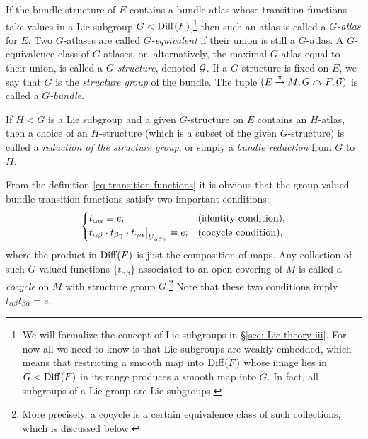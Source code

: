 \begin{defn}[$G$-structure]
    If the bundle structure of $E$ contains a bundle atlas whose transition functions take values in a Lie subgroup $G<\operatorname{Diff}(F)$,\footnote{We will formalize the concept of Lie subgroups in \S\ref{sec: Lie theory iii}. For now all we need to know is that Lie subgroups are weakly embedded, which means that restricting a smooth map into $\operatorname{Diff}(F)$ whose image lies in $G<\operatorname{Diff}(F)$ in its range produces a smooth map into $G$. In fact, all subgroups of a Lie group are Lie subgroups.} then such an atlas is called a \emph{$G$-atlas} for $E$. Two $G$-atlases are called \emph{$G$-equivalent} if their union is still a $G$-atlas. A $G$-equivalence class of $G$-atlases, or, alternatively, the maximal $G$-atlas equal to their union, is called a \emph{$G$-structure}, denoted $\mathcal{G}$. If a $G$-structure is fixed on $E$, we say that $G$ is the \emph{structure group} of the bundle.  The tuple $(E\overset{\pi}{\to}M,G\curvearrowright F,\mathcal{G})$ is called a \emph{$G$-bundle}.
    
    If $H<G$ is a Lie subgroup and a given $G$-structure on $E$ contains an $H$-atlas, then a choice of an $H$-structure (which is a subset of the given $G$-structure) is called a \emph{reduction of the structure group}, or simply a \emph{bundle reduction} from $G$ to $H$.
\end{defn}    

\begin{defn}[Cocycles]
    From the definition \eqref{eq transition functions} it is obvious that the group-valued bundle transition functions satisfy two important conditions:
    \[
    \begin{cases}
    t_{\alpha\alpha}\equiv e, & \text{(identity condition),}\\
    \restr{t_{\alpha\beta}\cdot t_{\beta\gamma}\cdot t_{\gamma\alpha}}{U_{\alpha\beta\gamma}}\equiv e; & \text{(cocycle condition),}
    \end{cases}
    \]
    where the product in $\operatorname{Diff}(F)$ is just the composition of maps. Any collection of such $G$-valued functions $\{t_{\alpha\beta}\}$ associated to an open covering of $M$ is called a \emph{cocycle} on $M$ with structure group $G$.\footnote{More precisely, a cocycle is a certain equivalence class of such collections, which is discussed below.} Note that these two conditions imply $t_{\alpha\beta}t_{\beta\alpha}=e$.
\end{defn}

